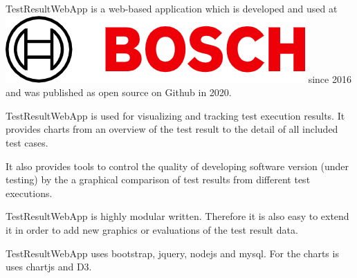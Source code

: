 



TestResultWebApp is a web-based application which is developed and used at
\includegraphics[height=\fontcharht\font`\B]{./pictures/Bosch-Logo.png} since 2016 and was published
as open source on Github in 2020.

TestResultWebApp is used for visualizing and tracking test execution results. It
provides charts from an overview of the test result to the detail of all included
test cases.

It also provides tools to control the quality of developing software version
(under testing) by the a graphical comparison of test results from different
test executions.

TestResultWebApp is highly modular written. Therefore it is also easy to extend
it in order to add new graphics or evaluations of the test result data.

TestResultWebApp uses bootstrap, jquery, nodejs and mysql. For the charts is uses
chartjs and D3.
